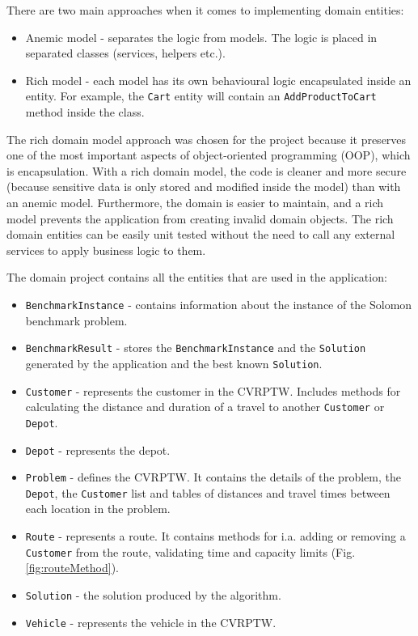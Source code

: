 \documentclass[a4paper,twoside,12pt]{book}
\begin{document}
There are two main approaches when it comes to implementing domain entities:
\begin{itemize}
    \item Anemic model - separates the logic from models. The logic is placed in separated classes (services, helpers etc.).
    \item Rich model - each model has its own behavioural logic encapsulated inside an entity.  For example, the \lstinline|Cart| entity will contain an \lstinline|AddProductToCart| method inside the class.
\end{itemize}

The rich domain model approach was chosen for the project because it preserves one of the most important aspects of object-oriented programming (OOP), which is encapsulation. With a rich domain model, the code is cleaner and more secure (because sensitive data is only stored and modified inside the model) than with an anemic model. Furthermore, the domain is easier to maintain, and a rich model prevents the application from creating invalid domain objects. The rich domain entities can be easily unit tested without the need to call any external services to apply business logic to them.

The domain project contains all the entities that are used in the application: 
\begin{itemize}
    \item \lstinline|BenchmarkInstance| - contains information about the instance of the Solomon benchmark problem.
    \item \lstinline|BenchmarkResult| - stores the \lstinline|BenchmarkInstance| and the \lstinline|Solution| generated by the application and the best known \lstinline|Solution|.
    \item \lstinline|Customer| - represents the customer in the CVRPTW. Includes methods for calculating the distance and duration of a travel to another \lstinline|Customer| or \lstinline|Depot|.
    \item \lstinline|Depot| - represents the depot.
    \item \lstinline|Problem| - defines the CVRPTW. It contains the details of the problem, the \lstinline|Depot|, the \lstinline|Customer| list and tables of distances and travel times between each location in the problem.
    \item \lstinline|Route| -  represents a route. It contains methods for i.a. adding or removing a \lstinline|Customer| from the route, validating time and capacity limits (Fig. \ref{fig:routeMethod}).
    \item \lstinline|Solution| - the solution produced by the algorithm.
    \item \lstinline|Vehicle| -  represents the vehicle in the CVRPTW.   
\end{itemize}
\end{document}

